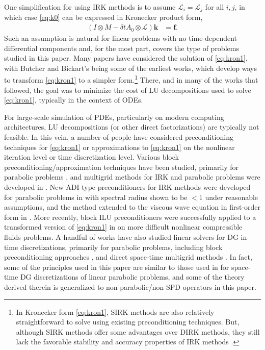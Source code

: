 \documentclass[review]{siamart}
\begin{document}
One simplification for using IRK methods is to assume $\mathcal{L}_i =
\mathcal{L}_j$ for all $i,j$, in which case \eqref{eq:k0} can be expressed in
Kronecker product form,
%
\begin{align}\label{eq:kron1}
(I\otimes M - \delta t A_0\otimes \mathcal{L})\mathbf{k} & = \mathbf{f}.
\end{align}
%
Such an assumption is natural for linear problems with no time-dependent differential
components and, for the most part, covers the type of problems studied in this paper.
Many papers have considered the solution of \eqref{eq:kron1}, with Butcher
\cite{butcher76} and Bickart's \cite{bickart77} being some of the earliest works,
which develop ways to transform \eqref{eq:kron1} to a simpler form.\footnote{In Kronecker form \eqref{eq:kron1}, SIRK methods \cite{norsett1976runge} are also
relatively straightforward to solve using existing preconditioning techniques.
But, although SIRK methods offer some advantages over DIRK methods, they still lack
the favorable stability and accuracy properties of IRK methods \cite{burrage82,orel91}.}
There, and in many of the works that followed, the goal was to minimize the cost of LU
decompositions used to solve \eqref{eq:kron1}, typically in the context of ODEs.

For large-scale simulation of PDEs, particularly on modern computing architectures,
LU decompositions (or other direct factorizations) are typically not feasible. In this
vein, a number of people have considered preconditioning techniques for \eqref{eq:kron1}
or approximations to \eqref{eq:kron1} on the nonlinear iteration level or time
discretization level. Various block preconditioning/approximation techniques
have been studied, primarily for parabolic problems
\cite{houwen97b,Houwen97c,nissen11,mardel07,staff06,hoffmann97,jay00}, and
multigrid methods for IRK and parabolic problems were developed in \cite{vanlent05}.
New ADI-type preconditioners for IRK methods were developed for parabolic problems
in \cite{chen14} with spectral radius shown to be $<1$ under reasonable assumptions,
and the method extended to the viscous wave equation in first-order form in
\cite{chen16}. More recently, block ILU preconditioners were successfully applied
to a transformed version of \eqref{eq:kron1} in \cite{pazner17} on more difficult
nonlinear compressible fluids problems.
A handful of works have also studied linear solvers for DG-in-time discretizations,
primarily for parabolic problems, including block preconditioning approaches
\cite{exh,8jp,27n}, and direct space-time multigrid methods
\cite{gander2016analysis}. In fact, some of the principles used in this paper
are similar to those used in \cite{exh} for space-time DG discretizations of
linear parabolic problems, and some of the theory derived therein is generalized
to non-parabolic/non-SPD operators in this paper.
\end{document}
